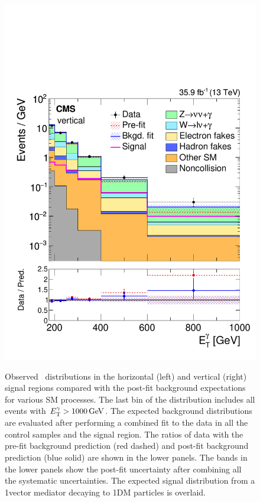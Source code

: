 \begin{figure}[htbp]
{    \includegraphics[]{Analysis/Figures/results/bonly_vertical.pdf}
  }
    \caption{
      Observed \ETg\ distributions in the horizontal (left) and vertical (right) signal regions compared with the post-fit background expectations for various SM processes.
      The last bin of the distribution includes all events with $E_{\mathrm{T}}^{\gamma} > 1000\,\text{Ge\hspace{-.08em}V}$. 
      The expected background distributions are evaluated after performing a combined fit to the data in all the control samples and the signal region. 
      The ratios of data with the pre-fit background prediction (red dashed) and post-fit background prediction (blue solid) are shown in the lower panels. 
      The bands in the lower panels show the post-fit uncertainty after combining all the systematic uncertainties. 
      The expected signal distribution from a 1\TeV vector mediator decaying to 1\GeV DM particles is overlaid.
    }
    \label{fig:postfitSR}
\end{figure}

